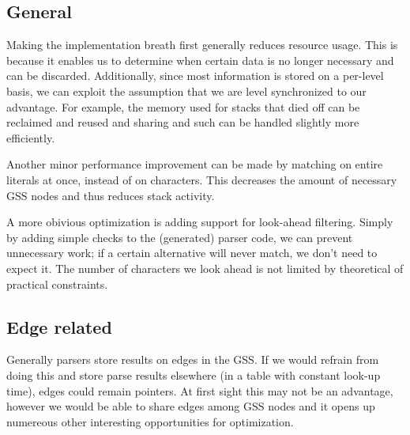 \documentclass[a4paper,10pt]{article}
\begin{document}
\subsection{General}

Making the implementation breath first generally reduces resource usage. This is because it enables us to determine when certain data is no longer necessary and can be discarded. Additionally, since most information is stored on a per-level basis, we can exploit the assumption that we are level synchronized to our advantage. For example, the memory used for stacks that died off can be reclaimed and reused and sharing and such can be handled slightly more efficiently.

Another minor performance improvement can be made by matching on entire literals at once, instead of on characters. This decreases the amount of necessary GSS nodes and thus reduces stack activity.

A more obivious optimization is adding support for look-ahead filtering. Simply by adding simple checks to the (generated) parser code, we can prevent unnecessary work; if a certain alternative will never match, we don't need to expect it. The number of characters we look ahead is not limited by theoretical of practical constraints.

\subsection{Edge related}

Generally parsers store results on edges in the GSS. If we would refrain from doing this and store parse results elsewhere (in a table with constant look-up time), edges could remain pointers. At first sight this may not be an advantage, however we would be able to share edges among GSS nodes and it opens up numereous other interesting opportunities for optimization.
\end{document}

